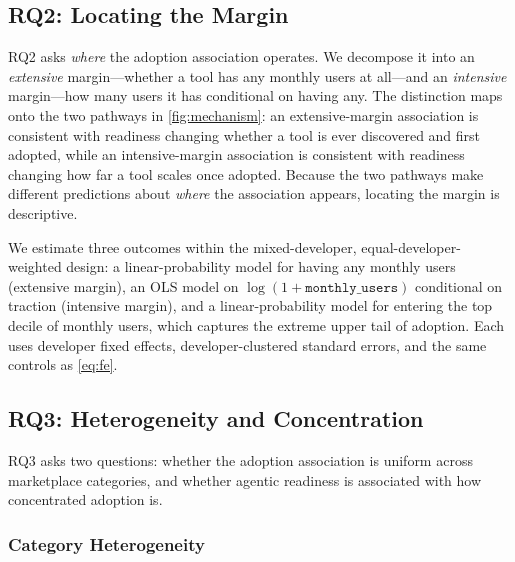 \subsection{RQ2: Locating the Margin}
\label{sec:methods-rq2}

RQ2 asks \emph{where} the adoption association operates. We decompose it into
an \emph{extensive} margin---whether a tool has any monthly users at all---and
an \emph{intensive} margin---how many users it has conditional on having any.
The distinction maps onto the two pathways in \autoref{fig:mechanism}: an
extensive-margin association is consistent with readiness changing whether a
tool is ever discovered and first adopted, while an intensive-margin
association is consistent with readiness changing how far a tool scales once
adopted. Because the two pathways make different predictions about
\emph{where} the association appears, locating the margin is descriptive.

We estimate three outcomes within the mixed-developer, equal-developer-weighted
design: a linear-probability model for having any monthly users (extensive
margin), an OLS model on $\log(1 + \texttt{monthly\_users})$ conditional on
traction (intensive margin), and a linear-probability model for entering the
top decile of monthly users, which captures the extreme upper tail of adoption.
Each uses developer fixed effects, developer-clustered standard errors, and the
same controls as \autoref{eq:fe}.

\subsection{RQ3: Heterogeneity and Concentration}
\label{sec:methods-rq3}

RQ3 asks two questions: whether the adoption association is uniform across
marketplace categories, and whether agentic readiness is associated with how
concentrated adoption is.

\subsubsection{Category Heterogeneity}

